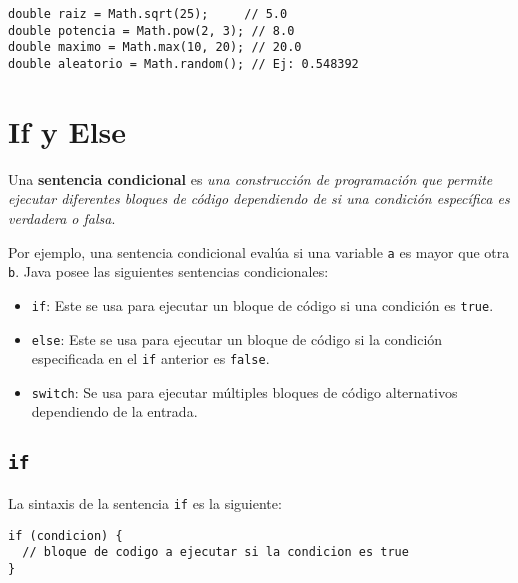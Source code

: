 \documentclass[12pt]{article}
\newcounter{it}
\theoremstyle{largebreak}
\begin{document}
    \begin{exa}
        \begin{lstlisting}[caption={Operaciones con la clase Math.},label=DescriptiveLabel]
double raiz = Math.sqrt(25);     // 5.0
double potencia = Math.pow(2, 3); // 8.0
double maximo = Math.max(10, 20); // 20.0
double aleatorio = Math.random(); // Ej: 0.548392
        \end{lstlisting}
    \end{exa}

    \section{If y Else}

    \begin{mydef}
        Una \textbf{sentencia condicional} es \textit{una construcción de programación que permite ejecutar diferentes bloques de código dependiendo de si una condición específica es verdadera o falsa}.
    \end{mydef}

    Por ejemplo, una sentencia condicional evalúa si una variable \lstinline|a| es mayor que otra \lstinline|b|. Java posee las siguientes sentencias condicionales:

    \begin{itemize}
        \item \lstinline|if|: Este se usa para ejecutar un bloque de código si una condición es \lstinline|true|.
        \item \lstinline|else|: Este se usa para ejecutar un bloque de código si la condición especificada en el \lstinline|if| anterior es \lstinline|false|. 
        \item \lstinline|switch|: Se usa para ejecutar múltiples bloques de código alternativos dependiendo de la entrada.
    \end{itemize}

    \subsection{\lstinline|if|}

    La sintaxis de la sentencia \lstinline|if| es la siguiente:
    \begin{lstlisting}[caption={Sintaxis de la sentencia \lstinline|if|.},label=DescriptiveLabel]
if (condicion) {
  // bloque de codigo a ejecutar si la condicion es true
}
    \end{lstlisting}
\end{document}
